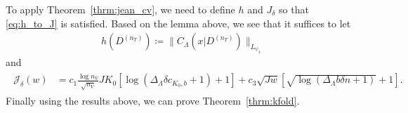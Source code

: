 \documentclass[10pt]{book}
\theoremstyle{definition}
\begin{document}
To apply Theorem~\ref{thrm:jean_cv}, we need to define $h$ and $J_\delta$ so that \eqref{eq:h_to_J} is satisfied.
Based on the lemma above, we see that it suffices to let
\begin{align}
h(D^{(n_T)}) \coloneqq \|C_\Lambda(x|D^{(n_T)})\|_{L_{\psi_2}}
\end{align}
and
\begin{align}
\begin{split}
\label{eq:j_delta}
\mathcal{J}_{\delta}(w) & =
c_{1} \frac{\log n_{V}}{\sqrt{n_{V}}}
JK_0\left[\log\left(\Delta_{\Lambda}\delta c_{K_0, b}+1\right)+1\right]
+c_{3}\sqrt{Jw}
\left[\sqrt{\log\left(\Delta_{\Lambda}b \delta n +1\right)}+1\right].
\end{split}
\end{align}
Finally using the results above, we can prove Theorem~\ref{thrm:kfold}.
\end{document}
